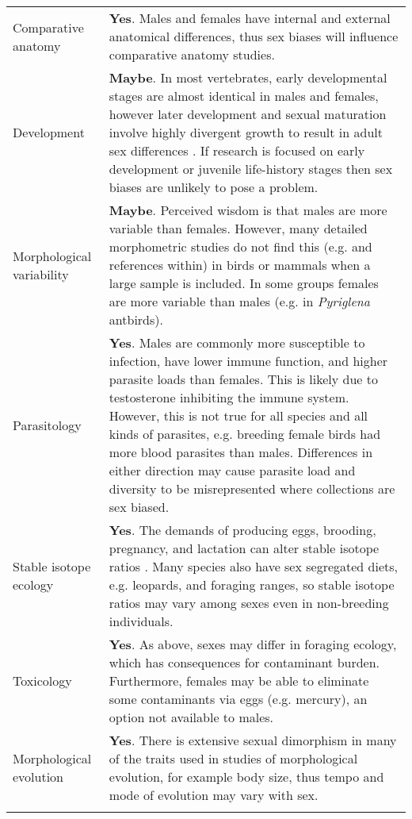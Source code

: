 \begin{longtable}{p{3cm} p{16cm}}
  Comparative anatomy & \textbf{Yes}. Males and females have internal and external anatomical differences, thus sex biases will influence comparative anatomy studies.\\ 

  Development & \textbf{Maybe}. In most vertebrates, early developmental stages are almost identical in males and females, however later development and sexual maturation involve highly divergent growth to result in adult sex differences \cite{badyaev2002growing}. If research is focused on early development or juvenile life-history stages then sex biases are unlikely to pose a problem.\\

  Morphological variability & \textbf{Maybe}. Perceived wisdom is that males are more variable than females. However, many detailed morphometric studies do not find this (e.g.\cite{polly1998variability,biswas2019} and references within) in birds or mammals when a large sample is included. In some groups females are more variable than males (e.g. in \textit{Pyriglena} antbirds\cite{isler2017calls}).\\ 

  Parasitology & \textbf{Yes}. Males are commonly more susceptible to infection, have lower immune function, and higher parasite loads than females\cite{zuk2009sicker}. This is likely due to testosterone inhibiting the immune system\cite{Klein:2016aa}. However, this is not true for all species and all kinds of parasites, e.g. breeding female birds had more blood parasites than males\cite{mccurdy1998sex}. Differences in either direction may cause parasite load and diversity to be misrepresented where collections are sex biased.\\ 

  Stable isotope ecology & \textbf{Yes}. The demands of producing eggs, brooding, pregnancy, and lactation can alter stable isotope ratios \cite{fuller2004nitrogen}. Many species also have sex segregated diets, e.g. leopards\cite{voigt2018sex}, and foraging ranges, so stable isotope ratios may vary among sexes even in non-breeding individuals.\\ 

  Toxicology & \textbf{Yes}. As above, sexes may differ in foraging ecology, which has consequences for contaminant burden. Furthermore, females may be able to eliminate some contaminants via eggs (e.g. mercury\cite{robinson2012sex}), an option not available to males.\\ 
  Morphological evolution & \textbf{Yes}. There is extensive sexual dimorphism in many of the traits used in studies of morphological evolution, for example body size\cite{Uyeda15908}, thus tempo and mode of evolution may vary with sex.\\ 

  \hline
\label{table_consequences}
\end{longtable}

